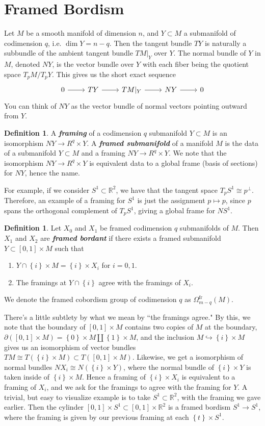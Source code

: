 \documentclass[psamsfonts]{amsart}
\theoremstyle{definition}
\newtheorem{defn}[thm]{Definition}
\theoremstyle{remark}
\newcommand{\R}{\mathbb{R}}
\newcommand{\ib}[1]{\textbf{\textit{#1}}}
\newcommand{\set}[1]{\left\lbrace #1 \right\rbrace}
\newcommand{\bd}{\partial}
\begin{document}
\section*{Framed Bordism}
%
Let $M$ be a smooth manifold of dimension $n$, and $Y \subset M$ a submanifold of codimension $q$, i.e. $\dim Y = n - q$. Then the tangent bundle $TY$ is naturally a subbundle of the ambient tangent bundle $TM\vert_Y$ over $Y$. The normal bundle of $Y$ in $M$, denoted $NY$, is the vector bundle over $Y$ with each fiber being the quotient space $T_pM / T_pY$. This gives us the short exact sequence
$$\begin{tikzcd}
0 \ar[r] & TY \ar[r] & TM\vert_Y \ar[r] & NY \ar[r] & 0
\end{tikzcd}$$
You can think of $NY$ as the vector bundle of normal vectors pointing outward from $Y$. 
%
\begin{defn}
A \ib{framing} of a codimension $q$ submanifold $Y \subset M$ is an isomorphism $NY \to R^q \times Y$. A \ib{framed submanifold} of a manifold $M$ is the data of a submanifold $Y \subset M$ and a framing $NY \to R^q \times Y$. We note that the isomorphism $NY \to R^q \times Y$ is equivalent data to a global frame (basis of sections) for $NY$, hence the name.
\end{defn}
For example, if we consider $S^1 \subset \R^2$, we have that the tangent space $T_pS^1 \cong p^\perp$. Therefore, an example of a framing for $S^1$ is just the assignment $p \mapsto p$, since $p$ spans the orthogonal complement of $T_pS^1$, giving a global frame for $NS^1$.
%
\begin{defn}
Let $X_0$ and $X_1$ be framed codimension $q$ submanifolds of $M$. Then $X_1$ and $X_2$ are \ib{framed bordant} if there exists a framed submanifold $Y \subset [0,1] \times M$ such that
\begin{enumerate}
\item $Y \cap \set{i} \times M = \set{i} \times X_i$ for $i = 0,1$.
\item The framings at $Y \cap \set{i}$ agree with the framings of $X_i$.
\end{enumerate}
We denote the framed cobordism group of codimension $q$ as $\Omega^{\text{fr}}_{m-q}(M)$. 
\end{defn}
There's a little subtlety by what we mean by ``the framings agree." By this, we note that the boundary of $[0,1] \times M$ contains two copies of $M$ at the boundary, $\bd([0,1] \times M) = \set{0} \times M \coprod \set{1} \times M$, and the inclusion $M \hookrightarrow \set{i} \times M$ gives us an isomorphism of vector bundles $TM \cong T(\set{i} \times M) \subset T([0,1] \times M)$. Likewise, we get a isomorphism of normal bundles $NX_i \cong N(\set{i} \times Y)$, where the normal bundle of $\set{i} \times Y$ is taken inside of $\set{i} \times M$. Hence a framing of $\set{i} \times X_i$ is equivalent to a framing of $X_i$, and we ask for the framings to agree with the framing for $Y$. A trivial, but easy to visualize example is to take $S^1 \subset \R^2$, with the framing we gave earlier. Then the cylinder $[0,1] \times S^1 \subset [0,1] \times \R^2$ is a framed bordism $S^1 \to S^1$, where the framing is given by our previous framing at each $\set{t} \times S^1$.
\end{document}
